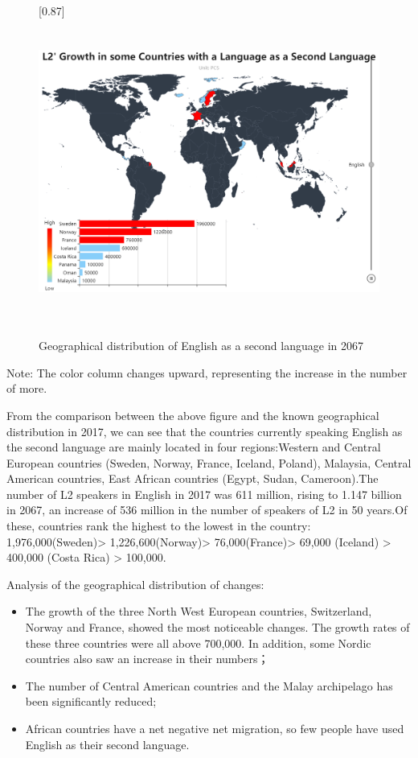 \begin{figure}[htbp]
	\centering
	 \scalebox{0.87}[0.87]{%
	\includegraphics[width=1\linewidth,height=10cm]{figures/english}
     }
	\caption{Geographical distribution of English as a second language in 2067}
	\label{fig:english}
\end{figure}

\noindent Note: The color column changes upward, representing the increase in the number of more.

 From the comparison between the above figure and the known geographical distribution in 2017, we can see that the countries currently speaking English as the second language are mainly located in four regions:Western and Central European countries (Sweden, Norway, France, Iceland, Poland), Malaysia, Central American countries, East African countries (Egypt, Sudan, Cameroon).The number of L2 speakers in English in 2017 was 611 million, rising to 1.147 billion in 2067, an increase of 536 million in the number of speakers of L2 in 50 years.Of these, countries rank the highest to the lowest in the country: 1,976,000(Sweden)> 1,226,600(Norway)> 76,000(France)> 69,000 (Iceland) > 400,000 (Costa Rica) > 100,000.
\par Analysis of the geographical distribution of changes:
\begin{itemize}
	\item The growth of the three North West European countries, Switzerland, Norway and France, showed the most noticeable changes. The growth rates of these three countries were all above 700,000. In addition, some Nordic countries also saw an increase in their numbers；
	\item The number of Central American countries and the Malay archipelago has been significantly reduced;
	\item African countries have a net negative net migration, so few people have used English as their second language. 
\end{itemize} 


